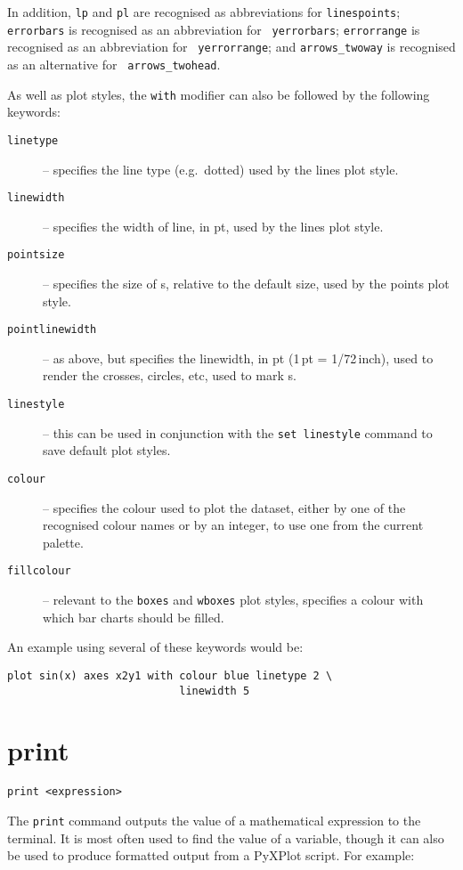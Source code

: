 In addition, {\tt lp} and {\tt pl} are recognised as abbreviations
for {\tt linespoints}; {\tt errorbars} is recognised as an abbreviation for {\tt
yerrorbars}; {\tt errorrange} is recognised as an abbreviation for {\tt
yerrorrange}; and {\tt arrows\_twoway} is recognised as an alternative for {\tt
arrows\_twohead}.

As well as plot styles, the {\tt with} modifier can also be followed by the
following keywords:

\begin{description}
\item[{\tt linetype}] -- specifies the line type (e.g.\ dotted) used by the lines plot style. 
\item[{\tt linewidth}] -- specifies the width of line, in pt, used by the lines plot style.
\item[{\tt pointsize}] -- specifies the size of \datapoint s, relative to the
default size, used by the points plot style. 
\item[{\tt pointlinewidth}] -- as above, but specifies the linewidth, in pt (1\,pt = 1/72\,inch),
used to render the crosses, circles, etc, used to mark \datapoint s. 
\item[{\tt linestyle}] -- this can be used in conjunction with the {\tt set linestyle} command to save default plot styles. 
\item[{\tt colour}] -- specifies the colour used to plot the dataset, either by
one of the recognised colour names or by an integer,
to use one from the current palette.  \item[{\tt fillcolour}] -- relevant to the
{\tt boxes} and {\tt wboxes} plot
styles, specifies a colour with which bar charts should be filled.
\end{description}

An example using several of these keywords would be:

\begin{verbatim}
plot sin(x) axes x2y1 with colour blue linetype 2 \
                           linewidth 5
\end{verbatim}


\section{print}

\begin{verbatim}
print <expression>
\end{verbatim}

The {\tt print} command outputs the value of a mathematical expression to the
terminal.  It is most often used to find the value of a variable, though it can
also be used to produce formatted output from a PyXPlot script. For example:

